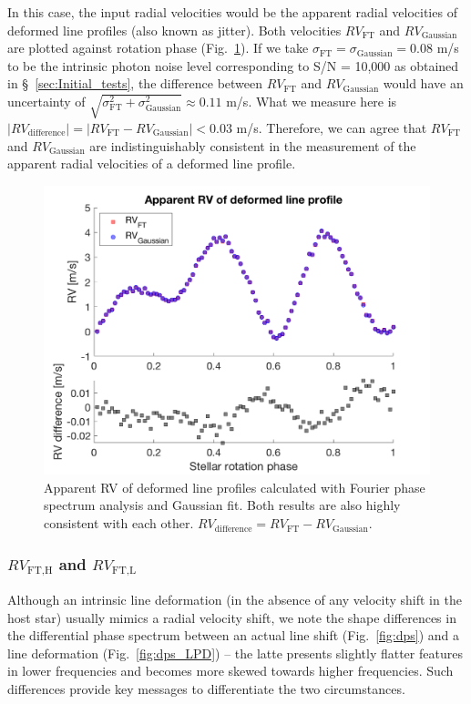 In this case, the input radial velocities would be the apparent radial velocities of deformed line profiles (also known as jitter). Both velocities $RV_\text{FT}$ and $RV_\text{Gaussian}$ are plotted against rotation phase (Fig.~\ref{fig:rv_recovery_deformed}). If we take $\sigma_\text{FT} = \sigma_\text{Gaussian} = 0.08$ m/s to be the intrinsic photon noise level corresponding to S/N = 10,000 as obtained in \S~\ref{sec:Initial_tests}, the difference between $RV_\text{FT}$ and $RV_\text{Gaussian}$ would have an uncertainty of $\sqrt{\sigma_\text{FT}^2+\sigma_\text{Gaussian}^2}\approx0.11$ m/s. What we measure here is $\mid RV_\text{difference}\mid = \mid RV_\text{FT} - RV_\text{Gaussian}\mid < 0.03$ m/s. Therefore, we can agree that $RV_\text{FT}$ and $RV_\text{Gaussian}$ are indistinguishably consistent in the measurement of the apparent radial velocities of a deformed line profile. 

\begin{figure}[tbp]
\centering
\includegraphics[width = 0.7 \linewidth]
{./Figures/Methods/5-JITTER_ONLY_3.png}
\caption[Apparent RV of deformed line profiles]
{Apparent RV of deformed line profiles calculated with Fourier phase spectrum analysis and Gaussian fit. Both results are also highly consistent with each other. $RV_\text{difference} = RV_\text{FT} - RV_\text{Gaussian}$.}
\label{fig:rv_recovery_deformed}
\end{figure} 
\FloatBarrier

\subsubsection{$RV_\text{FT,H}$ and $RV_\text{FT,L}$}
\label{subsec:FT,HL}

Although an intrinsic line deformation (in the absence of any velocity shift in the host star) usually mimics a radial velocity shift, we note the shape differences in the differential phase spectrum between an actual line shift (Fig.~\ref{fig:dps}) and a line deformation (Fig.~\ref{fig:dps_LPD}) -- the latte presents slightly flatter features in lower frequencies and becomes more skewed towards higher frequencies. Such differences provide key messages to differentiate the two circumstances.

